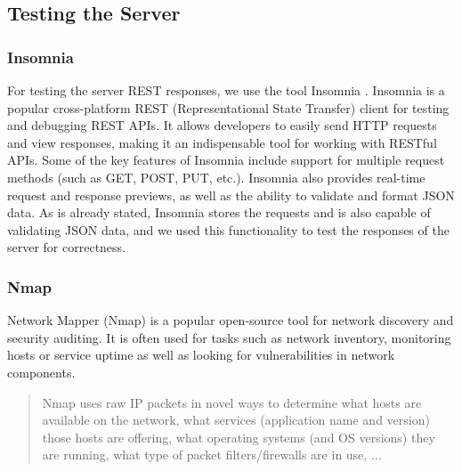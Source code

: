 \documentclass{article}
\begin{document}
        \subsection{Testing the Server}
        \label{sec:testing-the-server}


            \subsubsection*{Insomnia}
            \label{sec:insomnia-server}
            
                For testing the server REST responses, we use the tool Insomnia \cite{konginc.IntroductionInsomnia}.
                Insomnia is a popular cross-platform REST (Representational State Transfer) client for testing and debugging REST APIs. It allows developers to easily send HTTP requests and view responses, making it an indispensable tool for working with RESTful APIs. Some of the key features of Insomnia include support for multiple request methods (such as GET, POST, PUT, etc.). Insomnia also provides real-time request and response previews, as well as the ability to validate and format JSON data.
                As is already stated, Insomnia stores the requests and is also capable of validating JSON data, and we used this functionality to test the responses of the server for correctness.

                   

            \subsubsection*{Nmap}
            \label{sec:nmap-server}

                Network Mapper (Nmap) is a popular open-source tool for network discovery and security auditing. It is often used for tasks such as network inventory, monitoring hosts or service uptime as well as looking for vulnerabilities in network components.

                \begin{quote}
                    Nmap uses raw IP packets in novel ways to determine what hosts are available on the network, what services (application name and version) those hosts are offering, what operating systems (and OS versions) they are running, what type of packet filters/firewalls are in use, ... \cite{NmapNetworkMapper}
                \end{quote}
\end{document}
